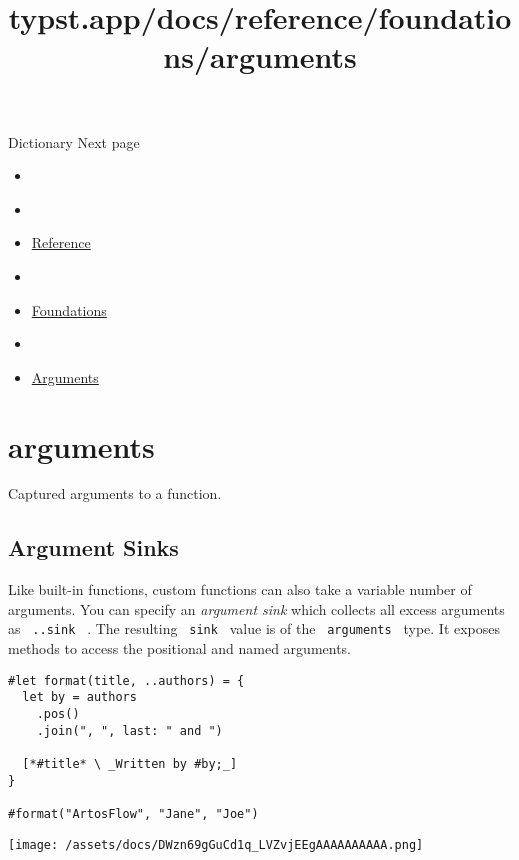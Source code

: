 { Dictionary } { Next page }


\title{typst.app/docs/reference/foundations/arguments}

\begin{itemize}
\tightlist
\item
  \href{/docs}{}
\item
  
\item
  \href{/docs/reference/}{Reference}
\item
  
\item
  \href{/docs/reference/foundations/}{Foundations}
\item
  
\item
  \href{/docs/reference/foundations/arguments/}{Arguments}
\end{itemize}

\section{\texorpdfstring{{ arguments }}{ arguments }}\label{summary}

Captured arguments to a function.

\subsection{Argument Sinks}\label{argument-sinks}

Like built-in functions, custom functions can also take a variable
number of arguments. You can specify an \emph{argument sink} which
collects all excess arguments as \texttt{\ ..sink\ } . The resulting
\texttt{\ sink\ } value is of the \texttt{\ arguments\ } type. It
exposes methods to access the positional and named arguments.

\begin{verbatim}
#let format(title, ..authors) = {
  let by = authors
    .pos()
    .join(", ", last: " and ")

  [*#title* \ _Written by #by;_]
}

#format("ArtosFlow", "Jane", "Joe")
\end{verbatim}

\texttt{[image: /assets/docs/DWzn69gGuCd1q\_LVZvjEEgAAAAAAAAAA.png]}

